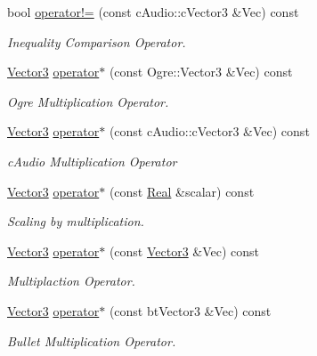 \begin{DoxyCompactItemize}
bool \hyperlink{classphys_1_1Vector3_a710970ea3bc8322f983ef9be3bd01c82}{operator!=} (const cAudio::cVector3 \&Vec) const 
\begin{DoxyCompactList}\small\item\em Inequality Comparison Operator. \item\end{DoxyCompactList}\item 
\hyperlink{classphys_1_1Vector3}{Vector3} \hyperlink{classphys_1_1Vector3_ae28e8373fb05d55edbde46eda64c431a}{operator$\ast$} (const Ogre::Vector3 \&Vec) const 
\begin{DoxyCompactList}\small\item\em Ogre Multiplication Operator. \item\end{DoxyCompactList}\item 
\hyperlink{classphys_1_1Vector3}{Vector3} \hyperlink{classphys_1_1Vector3_a8bfb89d47b4aceed530fe81202c6f368}{operator$\ast$} (const cAudio::cVector3 \&Vec) const 
\begin{DoxyCompactList}\small\item\em cAudio Multiplication Operator \item\end{DoxyCompactList}\item 
\hyperlink{classphys_1_1Vector3}{Vector3} \hyperlink{classphys_1_1Vector3_ab9b40eb9eb73d806434550604e048faa}{operator$\ast$} (const \hyperlink{namespacephys_af7eb897198d265b8e868f45240230d5f}{Real} \&scalar) const 
\begin{DoxyCompactList}\small\item\em Scaling by multiplication. \item\end{DoxyCompactList}\item 
\hyperlink{classphys_1_1Vector3}{Vector3} \hyperlink{classphys_1_1Vector3_a19eef355e6376acfb1d631aab63fdea5}{operator$\ast$} (const \hyperlink{classphys_1_1Vector3}{Vector3} \&Vec) const 
\begin{DoxyCompactList}\small\item\em Multiplaction Operator. \item\end{DoxyCompactList}\item 
\hyperlink{classphys_1_1Vector3}{Vector3} \hyperlink{classphys_1_1Vector3_ac9b49852c6bd2fa2b81f4972d7761697}{operator$\ast$} (const btVector3 \&Vec) const 
\begin{DoxyCompactList}\small\item\em Bullet Multiplication Operator. \item\end{DoxyCompactList}\item 

\end{DoxyCompactItemize}
